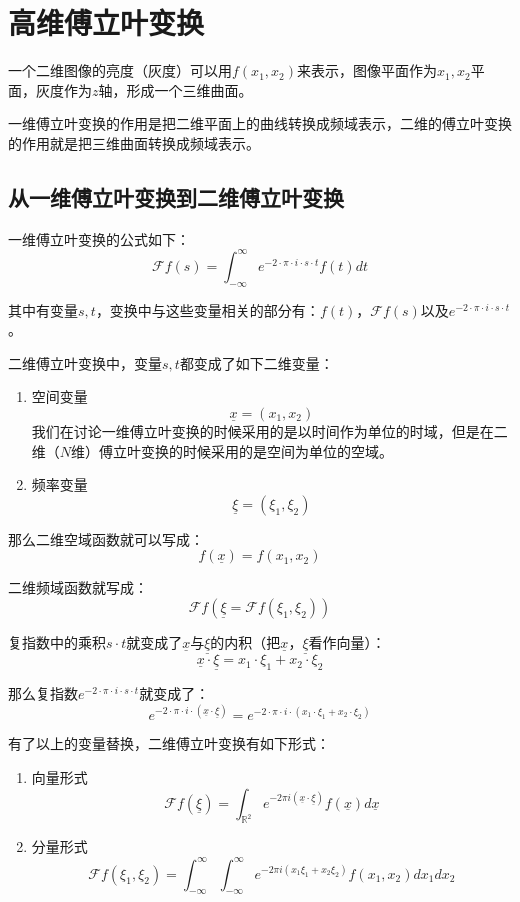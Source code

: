 \chapter{高维傅立叶变换}
一个二维图像的亮度（灰度）可以用$f(x_1,x_2)$来表示，图像平面作为$x_1,x_2$平面，灰度作为$z$轴，形成一个三维曲面。

一维傅立叶变换的作用是把二维平面上的曲线转换成频域表示，二维的傅立叶变换的作用就是把三维曲面转换成频域表示。
\section{从一维傅立叶变换到二维傅立叶变换}
一维傅立叶变换的公式如下：
$$
	\mathcal{F}f(s) = \int_{-\infty}^{\infty}e^{-2\cdot \pi \cdot i\cdot s\cdot t}f(t)dt
$$

其中有变量$s,t$，变换中与这些变量相关的部分有：$f(t)$，$\mathcal{F}f(s)$以及$e^{-2\cdot \pi\cdot  i\cdot s\cdot t}$。

二维傅立叶变换中，变量$s,t$都变成了如下二维变量：
\begin{enumerate}
	\item 空间变量
	      $$
		      \underline{x}=(x_1,x_2)
	      $$
	      我们在讨论一维傅立叶变换的时候采用的是以时间作为单位的时域，但是在二维（$N$维）傅立叶变换的时候采用的是空间为单位的空域。
	\item 频率变量
	      $$
		      \underline{\xi} = (\xi_1,\xi_2)
	      $$
\end{enumerate}

那么二维空域函数就可以写成：
$$
	f(\underline{x}) = f(x_1,x_2)
$$

二维频域函数就写成：
$$
	\mathcal{F}f(\underline{\xi} = \mathcal{F}f(\xi_1,\xi_2))
$$

复指数中的乘积$s\cdot t$就变成了$\underline{x}$与$\underline{\xi}$的内积（把$\underline{x}$，$\underline{\xi}$看作向量）：
$$
	\underline{x}\cdot \underline{\xi}=x_1\cdot \xi_1+x_2\cdot \xi_2
$$

那么复指数$e^{-2\cdot\pi\cdot i\cdot s\cdot t}$就变成了：
$$
	e^{-2\cdot\pi\cdot i\cdot (\underline{x}\cdot \underline{\xi})}=e^{-2\cdot\pi\cdot i\cdot (x_1\cdot \xi_1+x_2\cdot \xi_2)}
$$

有了以上的变量替换，二维傅立叶变换有如下形式：
\begin{enumerate}
	\item 向量形式
	      $$
		      \mathcal{F}f(\underline{\xi}) = \int_{\mathbb{R}^2}e^{-2\pi i(\underline{x}\cdot \underline{\xi})}f(\underline{x})d\underline{x}
	      $$
	\item 分量形式
	      $$
		      \mathcal{F}f(\xi_1,\xi_2) = \int_{-\infty}^{\infty}\int_{-\infty}^{\infty}e^{-2\pi i(x_1\xi_1+x_2\xi_2)}f(x_1,x_2)dx_1dx_2
	      $$
\end{enumerate}
